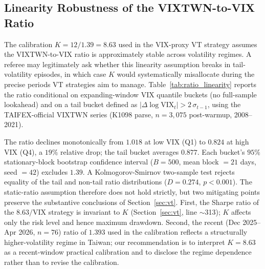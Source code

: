 %

\subsection{Linearity Robustness of the VIXTWN-to-VIX Ratio}\label{sec:vixtwn_ratio_linearity}

The calibration $K = 12/1.39 = 8.63$ used in the VIX-proxy VT strategy
assumes the VIXTWN-to-VIX ratio is approximately stable across volatility
regimes. A referee may legitimately ask whether this linearity assumption
breaks in tail-volatility episodes, in which case $K$ would systematically
misallocate during the precise periods VT strategies aim to manage.
Table~\ref{tab:ratio_linearity} reports the ratio conditional on
expanding-window VIX quantile buckets (no full-sample lookahead) and on a
tail bucket defined as $|\Delta \log \text{VIX}_t| > 2\,\sigma_{t-1}$, using
the TAIFEX-official VIXTWN series (K1098 parse, $n=3{,}075$ post-warmup,
2008--2021).

The ratio declines monotonically from $1.018$ at low VIX (Q1) to $0.824$
at high VIX (Q4), a $19\%$ relative drop; the tail bucket averages $0.877$.
Each bucket's $95\%$ stationary-block bootstrap confidence interval
($B=500$, mean block $=21$ days, seed $=42$) excludes $1.39$. A
Kolmogorov-Smirnov two-sample test rejects equality of the tail and
non-tail ratio distributions ($D=0.274$, $p < 0.001$). The static-ratio
assumption therefore does not hold strictly, but two mitigating points
preserve the substantive conclusions of Section~\ref{sec:vt}. First, the
Sharpe ratio of the $8.63/\text{VIX}$ strategy is invariant to $K$
(Section~\ref{sec:vt}, line $\sim$313); $K$ affects only the risk level
and hence maximum drawdown. Second, the recent (Dec 2025--Apr 2026,
$n=76$) ratio of $1.393$ used in the calibration reflects a structurally
higher-volatility regime in Taiwan; our recommendation is to interpret
$K=8.63$ as a recent-window practical calibration and to disclose the
regime dependence rather than to revise the calibration.

